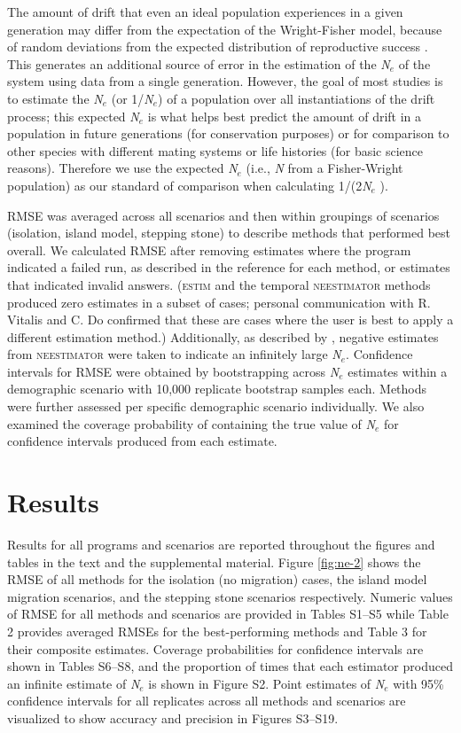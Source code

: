 The amount of drift that even an ideal population experiences in a given generation may 
differ from the expectation of the Wright-Fisher model, because of random deviations from 
the expected distribution of reproductive success \citep{Waples:2009}. This generates 
an additional source of error in the estimation of the \emph{N}$_e$ of the system using 
data from a single generation. However, the goal of most studies is to estimate the \emph{N}$_e$ 
(or 1/\emph{N}$_e$) of a population over all instantiations of the drift process; this expected 
\emph{N}$_e$ is what helps best predict the amount of drift in a population in future generations 
(for conservation purposes) or for comparison to other species with different mating systems or 
life histories (for basic science reasons). Therefore we use the expected \emph{N}$_e$ 
(i.e., \emph{N} from a Fisher-Wright population) as our standard of comparison when calculating 1/(2\emph{N}$_e$ ).

RMSE was averaged across all scenarios and then within groupings of scenarios 
(isolation, island model, stepping stone) to describe methods that performed best overall. 
We calculated RMSE after removing estimates where the program indicated a failed run, as 
described in the reference for each method, or estimates that indicated invalid answers. (\textsc{estim} and the
temporal \textsc{neestimator} methods produced zero estimates in a subset of cases; 
personal communication with R. Vitalis and C. Do confirmed that these are cases where the 
user is best to apply a different estimation method.) Additionally, as described by \citet{Do:2014}, 
negative estimates from \textsc{neestimator} were taken to indicate an infinitely large \emph{N}$_e$. 
Confidence intervals for RMSE were obtained by bootstrapping across \emph{N}$_e$ estimates within a 
demographic scenario with 10,000 replicate bootstrap samples each. Methods were further assessed per 
specific demographic scenario individually. We also examined the coverage probability of containing 
the true value of \emph{N}$_e$ for confidence intervals produced from each estimate.

\section{Results}
Results for all programs and scenarios are reported throughout the figures and tables in the text 
and the supplemental material. Figure \ref{fig:ne-2} shows the RMSE of all methods for the isolation (no migration) 
cases, the island model migration scenarios, and the stepping stone scenarios respectively. Numeric 
values of RMSE for all methods and scenarios are provided in Tables S1--S5 while Table 2 provides 
averaged RMSEs for the best-performing methods and Table 3 for their composite estimates. 
Coverage probabilities for confidence intervals are shown in Tables S6--S8, and the proportion 
of times that each estimator produced an infinite estimate of \emph{N}$_e$ is shown in Figure S2. 
Point estimates of \emph{N}$_e$ with 95\% confidence intervals for all replicates across all 
methods and scenarios are visualized to show accuracy and precision in Figures S3--S19.

